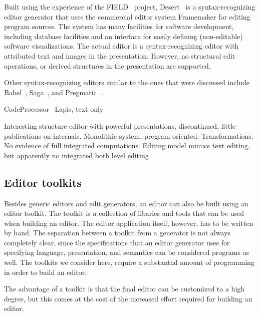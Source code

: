 
Built using the experience of the FIELD~\cite{reiss94field} project, Desert~\cite{reiss99desert} is a syntax-recognizing editor generator that uses the commercial editor system Framemaker for editing program sources. The system has many facilities for software development, including database facilities and an interface for easily defining (non-editable) software visualizations. The actual editor is a syntax-recognizing editor with attributed text and images in the presentation. However, no structural edit operations, or derived structures in the presentation are supported.


Other syntax-recognizing editors similar to the ones that were discussed include  Babel~\cite{horton81babel}, Saga~\cite{campbell84saga}, and Pregmatic~\cite{brand92pregmatic}.



\bc
CodeProcessor~\cite{codeprocessor}
Lapis, text only

Interesting structure editor with powerful presentations, discontinued, little publications on
internals. Monolithic system, program oriented. Transformations. No evidence of full 
integrated computations. Editing model mimics text editing, but apparently no integrated
both level editing
\ec


%																
\subsection {Editor toolkits}

Besides generic editors and edit generators, an editor can also be built using an editor toolkit. The toolkit is a collection of libaries and tools that can be used when building an editor. The editor application itself, however, has to be written by hand. The separation between a toolkit from a generator is not always completely clear, since the specifications that an editor generator uses for specifying language, presentation, and semantics can be considered programs as well. The toolkits we consider here, require a substantial amount of programming in order to build an editor.

The advantage of a toolkit is that the final editor can be customized to a high degree, but this comes at the cost of the increased effort required for building an editor. 

